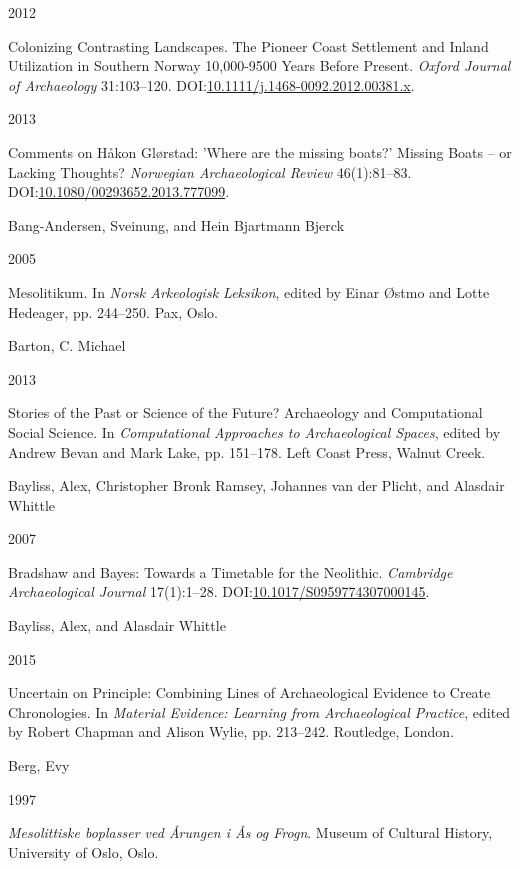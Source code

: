 \documentclass[
  a4paper,
  oneside]{uiophdthesis}
\newlength{\cslhangindent}
\newlength{\csllabelwidth}
\newlength{\cslentryspacingunit} %
\newenvironment{CSLReferences}[2] %
 {%
  \setlength{\parindent}{0pt}
  \ifodd #1
  \let\oldpar\par
  \def\par{\hangindent=\cslhangindent\oldpar}
  \fi
  \setlength{\parskip}{#2\cslentryspacingunit}
 }%
 {}
\newcommand{\CSLBlock}[1]{#1\hfill\break}
\newcommand{\CSLLeftMargin}[1]{\parbox[t]{\csllabelwidth}{#1}}
\newcommand{\CSLRightInline}[1]{\parbox[t]{\linewidth - \csllabelwidth}{#1}\break}
\begin{document}
\begin{CSLReferences}{0}{0}
\leavevmode{}%
\CSLLeftMargin{ 2012 }
\CSLRightInline{{Colonizing Contrasting Landscapes. The Pioneer Coast Settlement and Inland Utilization in Southern Norway 10,000-9500 Years Before Present}. \emph{Oxford Journal of Archaeology} 31:103--120. DOI:\href{https://doi.org/10.1111/j.1468-0092.2012.00381.x}{10.1111/j.1468-0092.2012.00381.x}.}

\leavevmode{}%
\CSLLeftMargin{ 2013 }
\CSLRightInline{{Comments on Håkon Glørstad: 'Where are the missing boats?' Missing Boats -- or Lacking Thoughts?} \emph{Norwegian Archaeological Review} 46(1):81--83. DOI:\href{https://doi.org/10.1080/00293652.2013.777099}{10.1080/00293652.2013.777099}.}

\leavevmode{}%
\CSLBlock{Bang-Andersen, Sveinung, and Hein Bjartmann Bjerck}
\CSLLeftMargin{ 2005}
\CSLRightInline{{Mesolitikum}. In \emph{{Norsk Arkeologisk Leksikon}}, edited by Einar Østmo and Lotte Hedeager, pp. 244--250. Pax, Oslo.}

\leavevmode{}%
\CSLBlock{Barton, C. Michael}
\CSLLeftMargin{ 2013}
\CSLRightInline{{Stories of the Past or Science of the Future? Archaeology and Computational Social Science}. In \emph{{Computational Approaches to Archaeological Spaces}}, edited by Andrew Bevan and Mark Lake, pp. 151--178. Left Coast Press, Walnut Creek.}

\leavevmode{}%
\CSLBlock{Bayliss, Alex, Christopher Bronk Ramsey, Johannes van der Plicht, and Alasdair Whittle}
\CSLLeftMargin{ 2007}
\CSLRightInline{{Bradshaw and Bayes: Towards a Timetable for the Neolithic}. \emph{Cambridge Archaeological Journal} 17(1):1--28. DOI:\href{https://doi.org/10.1017/S0959774307000145}{10.1017/S0959774307000145}.}

\leavevmode{}%
\CSLBlock{Bayliss, Alex, and Alasdair Whittle}
\CSLLeftMargin{ 2015}
\CSLRightInline{{Uncertain on Principle: Combining Lines of Archaeological Evidence to Create Chronologies}. In \emph{{Material Evidence: Learning from Archaeological Practice}}, edited by Robert Chapman and Alison Wylie, pp. 213--242. Routledge, London.}

\leavevmode{}%
\CSLBlock{Berg, Evy}
\CSLLeftMargin{ 1997}
\CSLRightInline{\emph{{Mesolittiske boplasser ved Årungen i Ås og Frogn}}. Museum of Cultural History, University of Oslo, Oslo.}


\end{CSLReferences}
\end{document}
